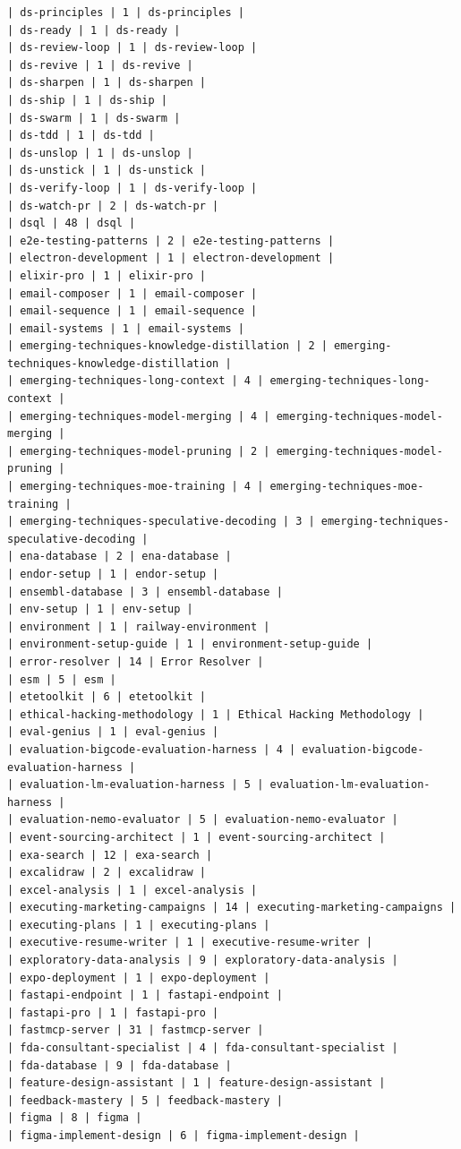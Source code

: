 \begin{Verbatim}[breaklines,breakanywhere,fontsize=\footnotesize]
| ds-principles | 1 | ds-principles |
| ds-ready | 1 | ds-ready |
| ds-review-loop | 1 | ds-review-loop |
| ds-revive | 1 | ds-revive |
| ds-sharpen | 1 | ds-sharpen |
| ds-ship | 1 | ds-ship |
| ds-swarm | 1 | ds-swarm |
| ds-tdd | 1 | ds-tdd |
| ds-unslop | 1 | ds-unslop |
| ds-unstick | 1 | ds-unstick |
| ds-verify-loop | 1 | ds-verify-loop |
| ds-watch-pr | 2 | ds-watch-pr |
| dsql | 48 | dsql |
| e2e-testing-patterns | 2 | e2e-testing-patterns |
| electron-development | 1 | electron-development |
| elixir-pro | 1 | elixir-pro |
| email-composer | 1 | email-composer |
| email-sequence | 1 | email-sequence |
| email-systems | 1 | email-systems |
| emerging-techniques-knowledge-distillation | 2 | emerging-techniques-knowledge-distillation |
| emerging-techniques-long-context | 4 | emerging-techniques-long-context |
| emerging-techniques-model-merging | 4 | emerging-techniques-model-merging |
| emerging-techniques-model-pruning | 2 | emerging-techniques-model-pruning |
| emerging-techniques-moe-training | 4 | emerging-techniques-moe-training |
| emerging-techniques-speculative-decoding | 3 | emerging-techniques-speculative-decoding |
| ena-database | 2 | ena-database |
| endor-setup | 1 | endor-setup |
| ensembl-database | 3 | ensembl-database |
| env-setup | 1 | env-setup |
| environment | 1 | railway-environment |
| environment-setup-guide | 1 | environment-setup-guide |
| error-resolver | 14 | Error Resolver |
| esm | 5 | esm |
| etetoolkit | 6 | etetoolkit |
| ethical-hacking-methodology | 1 | Ethical Hacking Methodology |
| eval-genius | 1 | eval-genius |
| evaluation-bigcode-evaluation-harness | 4 | evaluation-bigcode-evaluation-harness |
| evaluation-lm-evaluation-harness | 5 | evaluation-lm-evaluation-harness |
| evaluation-nemo-evaluator | 5 | evaluation-nemo-evaluator |
| event-sourcing-architect | 1 | event-sourcing-architect |
| exa-search | 12 | exa-search |
| excalidraw | 2 | excalidraw |
| excel-analysis | 1 | excel-analysis |
| executing-marketing-campaigns | 14 | executing-marketing-campaigns |
| executing-plans | 1 | executing-plans |
| executive-resume-writer | 1 | executive-resume-writer |
| exploratory-data-analysis | 9 | exploratory-data-analysis |
| expo-deployment | 1 | expo-deployment |
| fastapi-endpoint | 1 | fastapi-endpoint |
| fastapi-pro | 1 | fastapi-pro |
| fastmcp-server | 31 | fastmcp-server |
| fda-consultant-specialist | 4 | fda-consultant-specialist |
| fda-database | 9 | fda-database |
| feature-design-assistant | 1 | feature-design-assistant |
| feedback-mastery | 5 | feedback-mastery |
| figma | 8 | figma |
| figma-implement-design | 6 | figma-implement-design |

\end{Verbatim}
